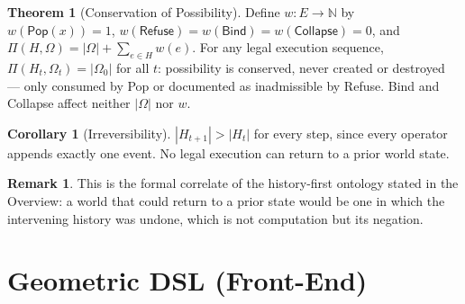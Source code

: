 \documentclass[12pt]{article}
\newcommand{\Pop}{\mathsf{Pop}}
\newcommand{\Nat}{\mathbb{N}}
\theoremstyle{definition}
\newtheorem{theorem}{Theorem}
\newtheorem{corollary}{Corollary}
\newtheorem{remark}{Remark}
\newcommand{\RefuseOp}{\mathsf{Refuse}}
\newcommand{\CollapseOp}{\mathsf{Collapse}}
\newcommand{\BindOp}{\mathsf{Bind}}
\newcommand{\OptZero}{\Omega_0}
\begin{document}
\begin{theorem}[Conservation of Possibility]
\label{thm:conservation}
Define $w:E\to\Nat$ by $w(\Pop(x))=1$, $w(\RefuseOp)=w(\BindOp)=w(\CollapseOp)=0$, and $\Pi(H,\Omega) = |\Omega| + \sum_{e\in H} w(e)$. For any legal execution sequence, $\Pi(H_t,\Omega_t) = |\OptZero|$ for all $t$: possibility is conserved, never created or destroyed — only consumed by Pop or documented as inadmissible by Refuse. Bind and Collapse affect neither $|\Omega|$ nor $w$.
\end{theorem}

\begin{corollary}[Irreversibility]
\label{cor:irrev}
$|H_{t+1}| > |H_t|$ for every step, since every operator appends exactly one event. No legal execution can return to a prior world state.
\end{corollary}

\begin{remark}
This is the formal correlate of the history-first ontology stated in the Overview: a world that could return to a prior state would be one in which the intervening history was undone, which is not computation but its negation.
\end{remark}

\section{Geometric DSL (Front-End)}
\end{document}
